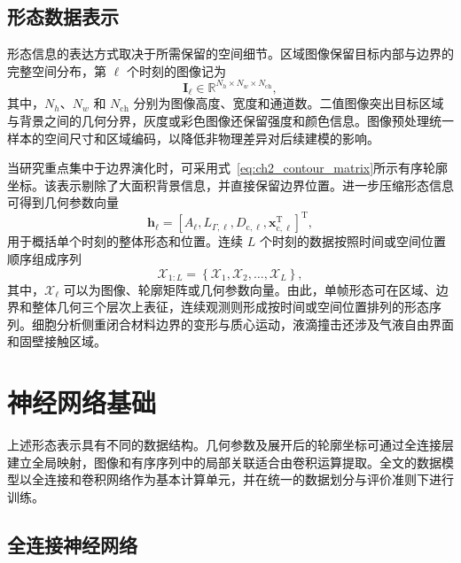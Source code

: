 \subsection{形态数据表示}
\label{subsec:ch2_representation}

形态信息的表达方式取决于所需保留的空间细节。区域图像保留目标内部与边界的完整空间分布，第 $\ell$ 个时刻的图像记为
\begin{equation}
\boldsymbol{I}_{\ell}
\in
\mathbb{R}^{N_h\times N_w\times N_{\mathrm{ch}}},
\label{eq:ch2_image_representation}
\end{equation}
其中，$N_h$、$N_w$ 和 $N_{\mathrm{ch}}$ 分别为图像高度、宽度和通道数。二值图像突出目标区域与背景之间的几何分界，灰度或彩色图像还保留强度和颜色信息。图像预处理统一样本的空间尺寸和区域编码，以降低非物理差异对后续建模的影响。

当研究重点集中于边界演化时，可采用式~\eqref{eq:ch2_contour_matrix}所示有序轮廓坐标。该表示剔除了大面积背景信息，并直接保留边界位置。进一步压缩形态信息可得到几何参数向量
\begin{equation}
\boldsymbol{h}_{\ell}
=
\left[
A_{\ell},
L_{\Gamma,\ell},
D_{\mathrm c,\ell},
\boldsymbol{x}_{\mathrm c,\ell}^{\mathrm T}
\right]^{\mathrm T},
\label{eq:ch2_geometry_vector}
\end{equation}
用于概括单个时刻的整体形态和位置。连续 $L$ 个时刻的数据按照时间或空间位置顺序组成序列
\begin{equation}
\mathcal{X}_{1:L}
=
\left\{
\mathcal{X}_1,
\mathcal{X}_2,
\ldots,
\mathcal{X}_L
\right\},
\label{eq:ch2_shape_sequence}
\end{equation}
其中，$\mathcal{X}_{\ell}$ 可以为图像、轮廓矩阵或几何参数向量。由此，单帧形态可在区域、边界和整体几何三个层次上表征，连续观测则形成按时间或空间位置排列的形态序列。细胞分析侧重闭合材料边界的变形与质心运动，液滴撞击还涉及气液自由界面和固壁接触区域。

\section{神经网络基础}
\label{sec:ch2_neural_network}

上述形态表示具有不同的数据结构。几何参数及展开后的轮廓坐标可通过全连接层建立全局映射，图像和有序序列中的局部关联适合由卷积运算提取。全文的数据模型以全连接和卷积网络作为基本计算单元，并在统一的数据划分与评价准则下进行训练。

\subsection{全连接神经网络}
\label{subsec:ch2_fnn}

